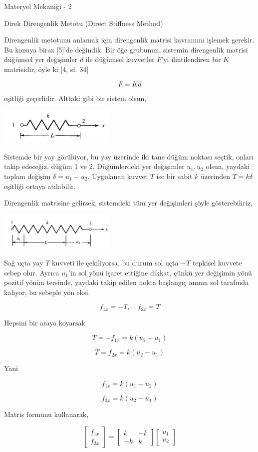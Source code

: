 \documentclass[12pt,fleqn]{article}\usepackage{../../common}
\begin{document}
Materyel Mekaniği - 2

Direk Direngenlik Metotu (Direct Stiffness Method)

Direngenlik metotunu anlamak için direngenlik matrisi kavramını işlemek
gerekir. Bu konuya biraz [5]'de değindik. Bir öğe grubunun, sistemin direngenlik
matrisi düğümsel yer değişimler $d$ ile düğümsel kuvvetler $F$'yi ilintilendiren
bir $K$ matrisidir, öyle ki [4, sf. 34]

$$
F = K d
$$

eşitliği geçerlidir. Alttaki gibi bir sistem olsun,

\includegraphics[width=15em]{phy_020_strs_06_03.jpg}

Sistemde bir yay görülüyor, bu yay üzerinde iki tane düğüm noktası seçtik,
onları takip edeceğiz, düğüm 1 ve 2. Düğümlerdeki yer değişimler $u_1,u_2$
olsun, yaydaki toplam değişim $\delta = u_1 - u_2$. Uygulanan kuvvet $T$
ise bir sabit $k$ üzerinden $T = k \delta$ eşitliği ortaya atılabilir.

Direngenlik matrisine gelirsek, sistemdeki tüm yer değişimleri şöyle gösterebiliriz,

\includegraphics[width=15em]{phy_020_strs_06_04.jpg}

Sağ uçta yay $T$ kuvveti ile çekiliyorsa, bu durum sol uçta $-T$ tepkisel
kuvvete sebep olur. Ayrıca $u_1$'in sol yönü işaret ettiğine dikkat, çünkü yer
değişimin yönü pozitif yönün tersinde, yaydaki takip edilen nokta başlangıç
anının sol tarafında kalıyor, bu sebeple yön eksi.

$$
f_{1x} = -T, \quad f_{2x} = T
$$

Hepsini bir araya koyarsak

$$
T = -f_{1x} = k (u_2 - u_1)
$$

$$
T = f_{2x} = k (u_2 - u_1)
$$

Yani

$$
f_{1x} = k(u_1 - u_2)
$$

$$
f_{2x} = k(u_2 - u_1)
$$

Matris formunu kullanarak,

$$
\left[\begin{array}{ccc}
f_{1x} \\ f_{2x}
\end{array}\right] = 
\left[\begin{array}{ccc}
k & -k \\ -k & k
\end{array}\right]
\left[\begin{array}{ccc}
u_1 \\ u_2
\end{array}\right]
$$
\end{document}
